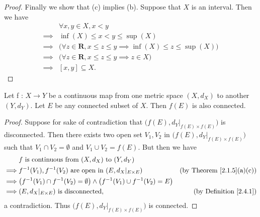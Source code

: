 \begin{proof}
    Finally we show that (c) implies (b).
    Suppose that \(X\) is an interval.
    Then we have
    \begin{align*}
                 & \forall x, y \in X, x < y                                                                \\
        \implies & \inf(X) \leq x < y \leq \sup(X)                                                          \\
        \implies & \big(\forall z \in \mathbf{R}, x \leq z \leq y \implies \inf(X) \leq z \leq \sup(X)\big) \\
        \implies & \big(\forall z \in \mathbf{R}, x \leq z \leq y \implies z \in X\big)                     \\
        \implies & [x, y] \subseteq X.
    \end{align*}
\end{proof}

\begin{theorem}\label{2.4.6}
    Let f : \(X \to Y\) be a continuous map from one metric space \((X, d_X)\) to another \((Y, d_Y)\).
    Let \(E\) be any connected subset of \(X\).
    Then \(f(E)\) is also connected.
\end{theorem}

\begin{proof}
    Suppose for sake of contradiction that \(\big(f(E), d_Y|_{f(E) \times f(E)}\big)\) is disconnected.
    Then there exists two open set \(V_1, V_2\) in \(\big(f(E), d_Y|_{f(E) \times f(E)}\big)\) such that \(V_1 \cap V_2 = \emptyset\) and \(V_1 \cup V_2 = f(E)\).
    But then we have
    \begin{align*}
                 & f \text{ is continuous from } (X, d_X) \text{ to } (Y, d_Y)                                                                                 \\
        \implies & f^{-1}(V_1), f^{-1}(V_2) \text{ are open in } (E, d_X|_{E \times E})                                & \text{(by Theorem \ref{2.1.5}(a)(c))} \\
        \implies & \big(f^{-1}(V_1) \cap f^{-1}(V_2) = \emptyset\big) \land \big(f^{-1}(V_1) \cup f^{-1}(V_2) = E\big)                                         \\
        \implies & (E, d_X|_{E \times E}) \text{ is disconnected},                                                     & \text{(by Definition \ref{2.4.1})}
    \end{align*}
    a contradiction.
    Thus \(\big(f(E), d_Y|_{f(E) \times f(E)}\big)\) is connected.
\end{proof}

